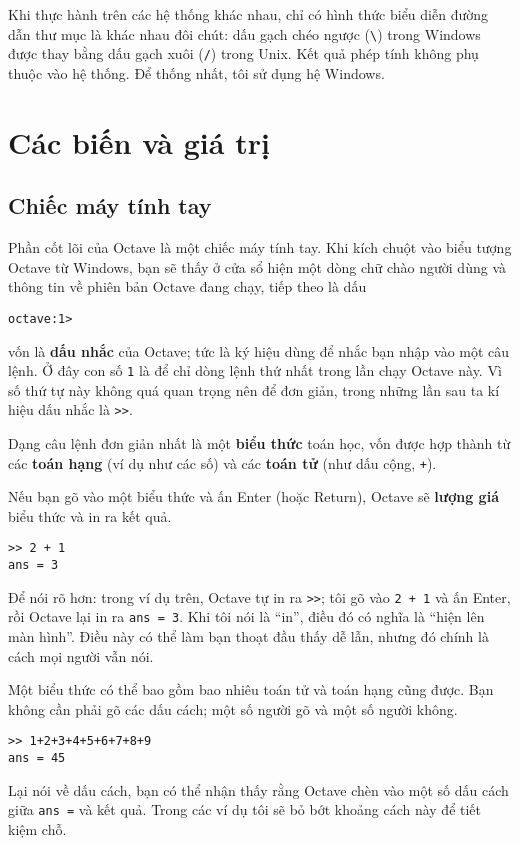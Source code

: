\documentclass[12pt]{book}
\begin{document}
Khi thực hành trên các hệ thống khác nhau, chỉ có hình thức biểu diễn đường dẫn
thư mục là khác nhau đôi chút: dấu gạch chéo ngược (\verb#\#) trong Windows 
được thay bằng dấu gạch xuôi (\verb#/#) trong Unix. Kết quả phép tính không
phụ thuộc vào hệ thống. Để thống nhất, tôi sử dụng hệ Windows.


\chapter{Các biến và giá trị}

\section{Chiếc máy tính tay}
\label{calc}

Phần cốt lõi của Octave là một chiếc máy tính tay. Khi kích chuột vào biểu tượng 
Octave từ Windows, bạn sẽ thấy ở cửa sổ hiện một dòng chữ chào người dùng và 
thông tin về phiên bản Octave đang chạy, tiếp theo là dấu 
\begin{verbatim}
octave:1>
\end{verbatim}
%
\noindent vốn là {\bf dấu nhắc} của Octave; tức là ký hiệu dùng để nhắc bạn nhập vào một
câu lệnh. Ở đây con số \texttt{1} là để chỉ dòng lệnh thứ nhất trong lần chạy Octave này.
Vì số thứ tự này không quá quan trọng nên để đơn giản, trong những lần sau ta 
kí hiệu dấu nhắc là \verb">>".

Dạng câu lệnh đơn giản nhất là một {\bf biểu thức} toán học, vốn được 
hợp thành từ các {\bf toán hạng} (ví dụ như các số) và các 
{\bf toán tử} (như dấu cộng, {\tt +}).

Nếu bạn gõ vào một biểu thức và ấn Enter (hoặc Return), Octave sẽ 
{\bf lượng giá} biểu thức và in ra kết quả.

\begin{verbatim}
>> 2 + 1
ans = 3
\end{verbatim}
%
Để nói rõ hơn: trong ví dụ trên, Octave tự in ra \verb#>>#; tôi  
gõ vào {\tt 2 + 1} và ấn Enter, rồi Octave lại in ra {\tt ans = 3}.
Khi tôi nói là ``in'', điều đó có nghĩa là ``hiện lên màn hình''. Điều này
có thể làm bạn thoạt đầu thấy dễ lẫn, nhưng đó chính là cách mọi người
vẫn nói.

Một biểu thức có thể bao gồm bao nhiêu toán tử và toán hạng cũng được.
Bạn không cần phải gõ các dấu cách; một số người gõ và một số người không.

\begin{verbatim}
>> 1+2+3+4+5+6+7+8+9
ans = 45
\end{verbatim}
%
Lại nói về dấu cách, bạn có thể nhận thấy rằng Octave chèn vào một số
dấu cách giữa {\tt ans =} và kết quả. Trong các ví dụ tôi sẽ bỏ bớt khoảng
cách này để tiết kiệm chỗ.
\end{document}

